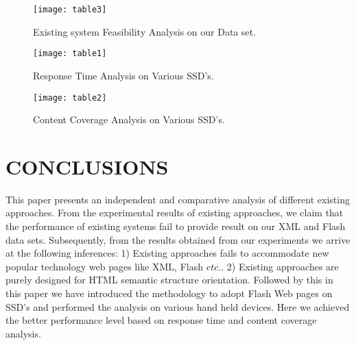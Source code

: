 \documentclass[fleqn,twoside]{article}
\begin{document}
\begin{figure*}[ht!]
\centering
\begin{center}
\texttt{[image: table3]}
\caption{Existing system Feasibility Analysis on our Data set.}
\end{center}
\end{figure*}




\begin{figure*}[ht!]
\centering
\begin{center}
\texttt{[image: table1]}
\caption{Response Time Analysis on Various SSD’s.}
\end{center}
\end{figure*}

\begin{figure*}[ht!]
\centering
\begin{center}
\texttt{[image: table2]}
\caption{Content Coverage Analysis on Various SSD’s.}
\end{center}
\end{figure*}


\section{CONCLUSIONS}
This paper presents an independent and comparative analysis of different existing approaches. From the experimental results of existing approaches, we claim that the performance of existing systems fail to provide result on our XML and Flash data sets. Subsequently, from the results obtained from our experiments we arrive at the following inferences: 1) Existing approaches fails to accommodate new popular technology web pages like XML, Flash $etc.$. 2) Existing approaches are purely designed for  HTML semantic structure orientation. Followed by this in this paper we have introduced the methodology to adopt Flash Web pages on SSD's and performed the analysis on various hand held devices. Here we achieved the better performance level based on response time and content coverage analysis. 

\small
\balance
\end{document}
